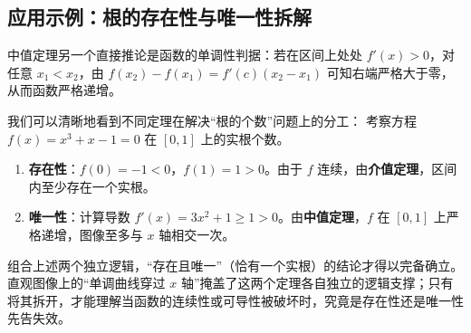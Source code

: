 \subsection{应用示例：根的存在性与唯一性拆解}

中值定理另一个直接推论是函数的单调性判据：若在区间上处处 \(f'(x) > 0\)，对任意 \(x_1 < x_2\)，由 \(f(x_2)-f(x_1) = f'(c)(x_2-x_1)\) 可知右端严格大于零，从而函数严格递增。

我们可以清晰地看到不同定理在解决``根的个数''问题上的分工：
考察方程 \(f(x) = x^3 + x - 1 = 0\) 在 \([0,1]\) 上的实根个数。
\begin{enumerate}
    \item \textbf{存在性}：\(f(0) = -1 < 0\)，\(f(1) = 1 > 0\)。由于 \(f\) 连续，由\textbf{介值定理}，区间内至少存在一个实根。
    \item \textbf{唯一性}：计算导数 \(f'(x) = 3x^2 + 1 \ge 1 > 0\)。由\textbf{中值定理}，\(f\) 在 \([0,1]\) 上严格递增，图像至多与 \(x\) 轴相交一次。
\end{enumerate}

组合上述两个独立逻辑，``存在且唯一''（恰有一个实根）的结论才得以完备确立。直观图像上的``单调曲线穿过 \(x\) 轴''掩盖了这两个定理各自独立的逻辑支撑；只有将其拆开，才能理解当函数的连续性或可导性被破坏时，究竟是存在性还是唯一性先告失效。